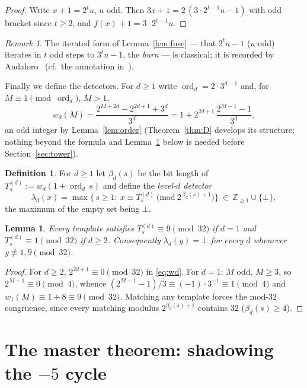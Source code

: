\documentclass[11pt]{article}
\newtheorem{lemma}[theorem]{Lemma}
\theoremstyle{definition}
\newtheorem{definition}[theorem]{Definition}
\theoremstyle{remark}
\newtheorem{remark}[theorem]{Remark}
\newcommand{\Z}{\mathbb{Z}}
\newcommand{\ord}{\operatorname{ord}}
\begin{document}
\begin{proof}
Write $x+1=2^{t}u$, $u$ odd. Then
$3x+1=2\,(3\cdot2^{t-1}u-1)$ with odd bracket since $t\ge2$, and
$f(x)+1=3\cdot2^{t-1}u$.
\end{proof}

\begin{remark}\label{rem:andaloro}
The iterated form of Lemma~\ref{lem:fuse} --- that $2^{t}u-1$ ($u$ odd)
iterates in $t$ odd steps to $3^{t}u-1$, the \emph{burn} --- is
classical; it is recorded by Andaloro~\cite{Andaloro2000} (cf.\ the
annotation in~\cite{LagariasBibII}).
\end{remark}

Finally we define the detectors. For $d\ge1$ write
$\ord_d=2\cdot3^{d-1}$ and, for $M\equiv1\pmod{\ord_d}$, $M>1$,
\begin{equation}\label{eq:wd}
w_d(M)=\frac{2^{M+2d}-2^{2d+1}+3^{d}}{3^{d}}
=1+2^{2d+1}\,\frac{2^{M-1}-1}{3^{d}} ,
\end{equation}
an odd integer by Lemma~\ref{lem:order} (Theorem~\ref{thm:D} develops
its structure; nothing beyond the formula and Lemma~\ref{lem:mod32}
below is needed before Section~\ref{sec:tower}).

\begin{definition}\label{def:detector}
For $d\ge1$ let $\beta_d(s)$ be the bit length of
$T^{(d)}_s:=w_d(1+\ord_d\,s)$ and define the \emph{level-$d$ detector}
\[
\lambda_d(x)=\max\bigl\{\,s\ge1:\
x\equiv T^{(d)}_s\ \bigl(\mathrm{mod}\ 2^{\,\beta_d(s)+1}\bigr)\bigr\}
\ \in\ \Z_{\ge1}\cup\{\bot\},
\]
the maximum of the empty set being $\bot$.
\end{definition}

\begin{lemma}\label{lem:mod32}
Every template satisfies $T^{(d)}_s\equiv9\pmod{32}$ if $d=1$ and
$T^{(d)}_s\equiv1\pmod{32}$ if $d\ge2$. Consequently
$\lambda_d(y)=\bot$ for every $d$ whenever
$y\not\equiv1,9\pmod{32}$.
\end{lemma}

\begin{proof}
For $d\ge2$, $2^{2d+1}\equiv0\pmod{32}$ in \eqref{eq:wd}. For $d=1$:
$M$ odd, $M\ge3$, so $2^{M-1}\equiv0\pmod4$, whence
$(2^{M-1}-1)/3\equiv(-1)\cdot3^{-1}\equiv1\pmod4$ and
$w_1(M)\equiv1+8\equiv9\pmod{32}$. Matching any template forces the
mod-$32$ congruence, since every matching modulus
$2^{\beta_d(s)+1}$ contains $32$ ($\beta_d(s)\ge4$).
\end{proof}

\section{The master theorem: shadowing the $-5$ cycle}\label{sec:shadow}
\end{document}
